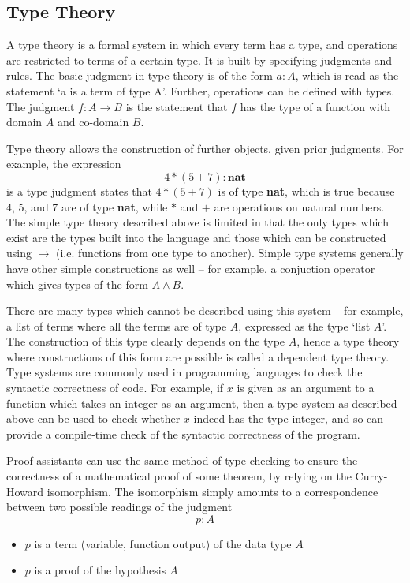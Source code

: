 \documentclass[runningheads,a4paper]{llncs}
\renewcommand{\-}{\setminus}
\begin{document}
\subsection{Type Theory}

A type theory is a formal system in which every term has a type, and operations are restricted to terms of a certain type. It is built by specifying judgments and rules. The basic judgment in type theory is of the form $a : A$, which is read as the statement `a is a term of type A'. Further, operations can be defined with types. The judgment $f : A \to B$ is the statement that $f$ has the type of a function with domain $A$ and co-domain $B$.

Type theory allows the construction of further objects, given prior judgments. For example, the expression
\[
4 * (5 + 7) : \textbf{nat}
\]
is a type judgment states that $4 * (5 + 7)$ is of type \textbf{nat}, which is true because 4, 5, and 7 are of type \textbf{nat}, while $*$ and $+$ are operations on natural numbers.\\

The simple type theory described above is limited in that the only types which exist are the types built into the language and those which can be constructed using $\to$ (i.e. functions from one type to another). Simple type systems generally have other simple constructions as well -- for example, a conjuction operator which gives types of the form $A \land B$.

There are many types which cannot be described using this system -- for example, a list of terms where all the terms are of type $A$, expressed as the type `list $A$'. The construction of this type clearly depends on the type $A$, hence a type theory where constructions of this form are possible is called a dependent type theory.\\

Type systems are commonly used in programming languages to check the syntactic correctness of code. For example, if $x$ is given as an argument to a function which takes an integer as an argument, then a type system as described above can be used to check whether $x$ indeed has the type integer, and so can provide a compile-time check of the syntactic correctness of the program.

Proof assistants can use the same method of type checking to ensure the correctness of a mathematical proof of some theorem, by relying on the Curry-Howard isomorphism. The isomorphism simply amounts to a correspondence between two possible readings of the judgment
\[
p : A
\]
\begin{itemize}
\item $p$ is a term (variable, function output) of the data type $A$
\item $p$ is a proof of the hypothesis $A$
\end{itemize}
\end{document}
